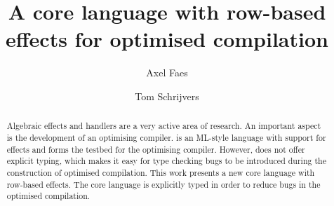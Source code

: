 \documentclass[sigplan,10pt]{acmart}\settopmatter{printfolios=true}
\begin{document}
\title{A core language with row-based effects for optimised compilation}

\author{Axel Faes}

\author{Tom Schrijvers}


\begin{abstract}
Algebraic effects and handlers are a very active area of research. An important aspect is the development of an optimising compiler. \eff is an ML-style language with support for effects and forms the testbed for the optimising compiler. However, \eff does not offer explicit typing, which makes it easy for type checking bugs to be introduced during the construction of optimised compilation. This work presents a new core language with row-based effects. The core language is explicitly typed in order to reduce bugs in the optimised compilation.
\end{abstract}

\maketitle
\end{document}
